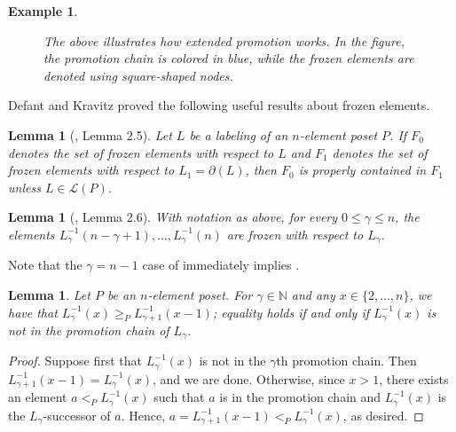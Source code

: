 \documentclass[11pt]{amsart}
\newtheorem{lemma}[thm]{Lemma}
\newtheorem{Example}[thm]{Example}
\newenvironment{example}
{\begin{Example}\rm}{\end{Example}}
\theoremstyle{definition}
\newcommand{\N}{\mathbb{N}}
\newcommand{\call}{\mathcal{L}}
\newcommand{\inverse}{^{-1}}
\begin{document}
\begin{example}
\begin{figure}[h!]
{	}
		\caption{The above illustrates how extended promotion works. In the figure, the promotion chain is colored in blue, while the frozen elements are denoted using square-shaped nodes.}
	\end{figure}
\end{example}

Defant and Kravitz proved the following useful results about frozen elements.
\begin{lemma}[\cite{DK20}, Lemma 2.5]\label{frozen proper}
	Let $ L $ be a labeling of an $ n $-element poset $ P $. If $ F_0 $ denotes the set of frozen elements with respect to $ L $ and $ F_1 $ denotes the set of frozen elements with respect to $ L_1=\partial(L) $, then $ F_0 $ is properly contained in $ F_1 $ unless $ L\in\call(P) $.
\end{lemma}
\begin{lemma}[\cite{DK20}, Lemma 2.6]\label{frozen elements}
	With notation as above, for every $ 0\leq\gamma\leq n $, the elements $ L_\gamma\inverse(n-\gamma+1),\ldots,L_\gamma\inverse(n) $ are frozen with respect to $ L_\gamma $. 
\end{lemma}

Note that the $ \gamma=n-1 $ case of  immediately implies .

\begin{lemma}\label{Swapnil lemma}
	Let $ P $ be an $ n $-element poset. For $ \gamma\in\N $ and any $ x\in\{2,\ldots,n\} $, we have that $ L_\gamma\inverse(x)\geq_PL_{\gamma+1}\inverse(x-1) $; equality holds if and only if $ L_\gamma\inverse(x) $ is not in the promotion chain of $ L_\gamma $. 
\end{lemma}
\begin{proof}
	Suppose first that $ L_\gamma\inverse(x) $ is not in the $ \gamma $th promotion chain. Then $ L_{\gamma+1}\inverse(x-1)=L_{\gamma}\inverse(x) $, and we are done. Otherwise, since $ x>1 $, there exists an element $ a<_PL_{\gamma}\inverse(x) $ such that $ a $ is in the promotion chain and $ L_{\gamma}\inverse(x) $ is the $ L_{\gamma} $-successor of $ a $. Hence, $ a=L_{\gamma+1}\inverse(x-1)<_PL_{\gamma}\inverse(x) $, as desired. 
\end{proof}
\end{document}
